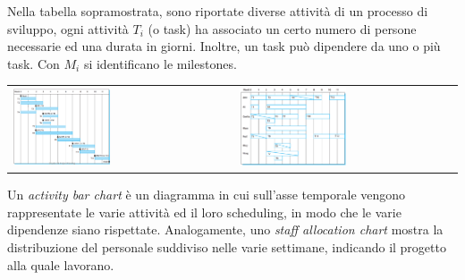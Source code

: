 \documentclass[10pt, letterpaper]{report}
\begin{document}
Nella tabella sopramostrata, sono riportate diverse attività di un processo 
di sviluppo, ogni attività $T_i$ (o task) ha associato un certo numero di persone necessarie ed 
una durata in giorni. Inoltre, un task può dipendere da uno o più task. Con $M_i$ si 
identificano le milestones.
\begin{center}
	\begin{tabular}{>{\centering\arraybackslash}m{3in}>{\arraybackslash}m{3in}}
        \includegraphics[width=0.45\textwidth ]{images/barChart.png} &
        \includegraphics[width=0.5\textwidth ]{images/staffChart.png}
	\end{tabular}
\end{center}
Un \textit{activity bar chart} è un diagramma in cui sull'asse temporale vengono rappresentate 
le varie attività ed il loro scheduling, in modo che le varie dipendenze siano rispettate.\acc 
Analogamente, uno \textit{staff allocation chart} mostra la distribuzione del personale 
suddiviso nelle varie settimane, indicando il progetto alla quale lavorano.\flowerLine 
\end{document}
